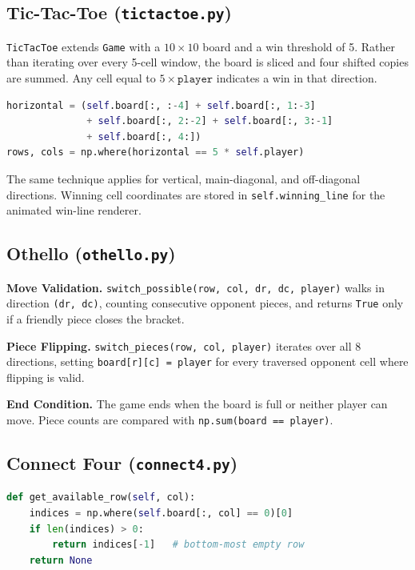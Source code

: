 \documentclass[12pt,a4paper]{article}
\begin{document}
\subsection{Tic-Tac-Toe (\texttt{tictactoe.py})}

\texttt{TicTacToe} extends \texttt{Game} with a $10\times10$ board and a win threshold of 5. Rather than iterating over every 5-cell window, the board is sliced and four shifted copies are summed. Any cell equal to $5 \times \texttt{player}$ indicates a win in that direction.

\begin{lstlisting}[language=Python, caption={Vectorised horizontal win check}]
horizontal = (self.board[:, :-4] + self.board[:, 1:-3]
              + self.board[:, 2:-2] + self.board[:, 3:-1]
              + self.board[:, 4:])
rows, cols = np.where(horizontal == 5 * self.player)
\end{lstlisting}

The same technique applies for vertical, main-diagonal, and off-diagonal directions. Winning cell coordinates are stored in \texttt{self.winning\_line} for the animated win-line renderer.

\subsection{Othello (\texttt{othello.py})}

\textbf{Move Validation.} \texttt{switch\_possible(row, col, dr, dc, player)} walks in direction \texttt{(dr, dc)}, counting consecutive opponent pieces, and returns \texttt{True} only if a friendly piece closes the bracket.

\textbf{Piece Flipping.} \texttt{switch\_pieces(row, col, player)} iterates over all 8 directions, setting \texttt{board[r][c] = player} for every traversed opponent cell where flipping is valid.

\textbf{End Condition.} The game ends when the board is full or neither player can move. Piece counts are compared with \texttt{np.sum(board == player)}.

\subsection{Connect Four (\texttt{connect4.py})}

\begin{lstlisting}[language=Python, caption={Gravity: finding the lowest empty row}]
def get_available_row(self, col):
    indices = np.where(self.board[:, col] == 0)[0]
    if len(indices) > 0:
        return indices[-1]   # bottom-most empty row
    return None
\end{lstlisting}
\end{document}
